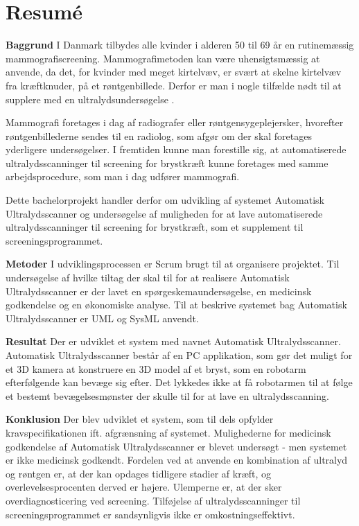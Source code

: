 \chapter{Resumé}
\textbf{Baggrund}
I Danmark tilbydes alle kvinder i alderen 50 til 69 år en rutinemæssig mammografiscreening. Mammografimetoden kan være uhensigtsmæssig at anvende, da det, for kvinder med meget kirtelvæv, er svært at skelne kirtelvæv fra kræftknuder, på et røntgenbillede. Derfor er man i nogle tilfælde nødt til at supplere med en ultralydsundersøgelse \cite{Ultralyd}.

Mammografi foretages i dag af radiografer eller røntgensygeplejersker, hvorefter røntgenbillederne sendes til en radiolog, som afgør om der skal foretages yderligere undersøgelser. I fremtiden kunne man forestille sig, at automatiserede ultralydsscanninger til screening for brystkræft kunne foretages med samme arbejdsprocedure, som man i dag udfører mammografi.

Dette bachelorprojekt handler derfor om udvikling af systemet Automatisk Ultralydsscanner og undersøgelse af muligheden for at lave automatiserede ultralydsscanninger til screening for brystkræft, som et supplement til screeningsprogrammet.

\textbf{Metoder}
I udviklingsprocessen er Scrum brugt til at organisere projektet. Til undersøgelse af hvilke tiltag der skal til for at realisere Automatisk Ultralydsscanner er der lavet en spørgeskemaundersøgelse, en medicinsk godkendelse og en økonomiske analyse. Til at beskrive systemet bag Automatisk Ultralydsscanner er UML og SysML anvendt. 

\textbf{Resultat}
Der er udviklet et system med navnet Automatisk Ultralydsscanner. Automatisk Ultralydsscanner består af en PC applikation, som gør det muligt for et 3D kamera at konstruere en 3D model af et bryst, som en robotarm efterfølgende kan bevæge sig efter. Det lykkedes ikke at få robotarmen til at følge et bestemt bevægelsesmønster der skulle til for at lave en ultralydsscanning. 

\textbf{Konklusion}
Der blev udviklet et system, som til dels opfylder kravspecifikationen ift. afgrænsning af systemet. Mulighederne for medicinsk godkendelse af Automatisk Ultralydsscanner er blevet undersøgt - men systemet er ikke medicinsk godkendt. Fordelen ved at anvende en kombination af ultralyd og røntgen er, at der kan opdages tidligere stadier af kræft, og overlevelsesprocenten derved er højere. Ulemperne er, at der sker overdiagnosticering ved screening. Tilføjelse af ultralydsscanninger til screeningsprogrammet er sandsynligvis ikke er omkostningseffektivt.